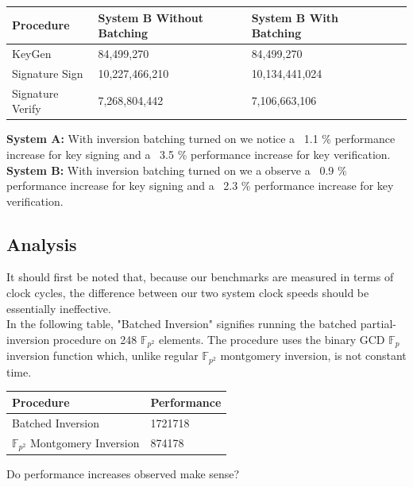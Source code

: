 \begin{center}
\begin{tabular}{@{}lllll@{}}
	\toprule
	Procedure & System B Without Batching & System B With Batching\\
	\midrule
	KeyGen & 84,499,270 & 84,499,270\\
	Signature Sign & 10,227,466,210 & 10,134,441,024\\
	Signature Verify & 7,268,804,442 & 7,106,663,106\\
	\bottomrule
\end{tabular}
\end{center}

\textbf{System A:} With inversion batching turned on we notice a ~1.1 \% performance increase for key signing and a ~3.5 \% performance increase for key verification.\\

\textbf{System B:} With inversion batching turned on we a observe a ~0.9 \% performance increase for key signing and a ~2.3 \% performance increase for key verification.\\

\subsection{Analysis}

It should first be noted that, because our benchmarks are measured in terms of clock cycles, the difference between our two system clock speeds should be essentially ineffective. \\

In the following table, "Batched Inversion" signifies running the batched partial-inversion procedure on 248 $\mathbb{F}_{p^{2}}$ elements. The procedure uses the binary GCD $\mathbb{F}_{p}$ inversion function which, unlike regular $\mathbb{F}_{p^{2}}$ montgomery inversion, is not constant time.\\

\begin{center}
\begin{tabular}{@{}ll@{}}
	\toprule
	Procedure & Performance \\
	\midrule
	Batched Inversion & 1721718\\
	$\mathbb{F}_{p^{2}}$ Montgomery Inversion & 874178\\
	\bottomrule
\end{tabular}
\end{center}

Do performance increases observed make sense?\\

